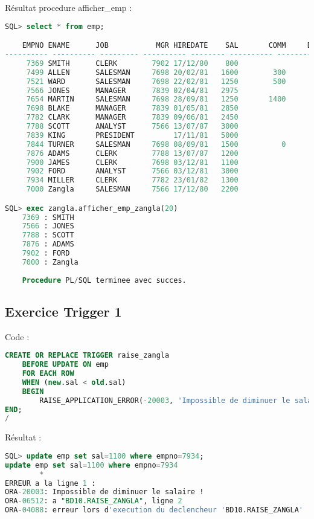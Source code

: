 \documentclass{article}
\begin{document}
\newpage
Résultat procedure afficher\_emp :
\begin{lstlisting}[language=SQL,
    morekeywords={DECLARE, LOOP, TYPE, FOR, IF, IS, OPEN, FETCH, DBMS_OUTPUT, PUT_LINE}]
SQL> select * from emp;

    EMPNO ENAME      JOB	       MGR HIREDATE	   SAL	     COMM     DEPTNO
---------- ---------- --------- ---------- -------- ---------- ---------- ----------
     7369 SMITH      CLERK	      7902 17/12/80	   800			            20
     7499 ALLEN      SALESMAN	  7698 20/02/81	  1600	      300	        30
     7521 WARD       SALESMAN	  7698 22/02/81	  1250	      500	        30
     7566 JONES      MANAGER	  7839 02/04/81	  2975			            20
     7654 MARTIN     SALESMAN	  7698 28/09/81	  1250	     1400	        30
     7698 BLAKE      MANAGER	  7839 01/05/81	  2850			            30
     7782 CLARK      MANAGER	  7839 09/06/81	  2450			            10
     7788 SCOTT      ANALYST	  7566 13/07/87	  3000			            20
     7839 KING       PRESIDENT 	       17/11/81	  5000			            10
     7844 TURNER     SALESMAN	  7698 08/09/81	  1500		    0           30
     7876 ADAMS      CLERK	      7788 13/07/87	  1200			            20
     7900 JAMES      CLERK	      7698 03/12/81	  1100			            30
     7902 FORD       ANALYST	  7566 03/12/81	  3000			            20
     7934 MILLER     CLERK	      7782 23/01/82	  1300			            10
     7000 Zangla     SALESMAN	  7566 17/12/80	  2200			            20

SQL> exec zangla.afficher_emp_zangla(20)
    7369 : SMITH
    7566 : JONES
    7788 : SCOTT
    7876 : ADAMS
    7902 : FORD
    7000 : Zangla
    
    Procedure PL/SQL terminee avec succes.
\end{lstlisting}


\subsection{Exercice Trigger 1}
Code :
\begin{lstlisting}[language=SQL,
    deletekeywords={char},
    morekeywords={DECLARE, LOOP, TYPE, FOR, IF, IS, OPEN, FETCH, DBMS_OUTPUT, PUT_LINE}]
CREATE OR REPLACE TRIGGER raise_zangla
	BEFORE UPDATE ON emp
	FOR EACH ROW
	WHEN (new.sal < old.sal)
	BEGIN
		RAISE_APPLICATION_ERROR(-20003, 'Impossible de diminuer le salaire !');
END;
/
\end{lstlisting}

Résultat :
\begin{lstlisting}[language=SQL,
    morekeywords={DECLARE, LOOP, TYPE, FOR, IF, IS, OPEN, FETCH, DBMS_OUTPUT, PUT_LINE}]
SQL> update emp set sal=1100 where empno=7934;
update emp set sal=1100 where empno=7934
        *
ERREUR a la ligne 1 :
ORA-20003: Impossible de diminuer le salaire !
ORA-06512: a "BD10.RAISE_ZANGLA", ligne 2
ORA-04088: erreur lors d'execution du declencheur 'BD10.RAISE_ZANGLA'
\end{lstlisting}
\end{document}
